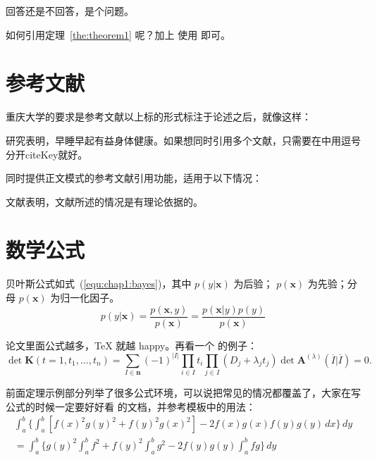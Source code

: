 \begin{problem}
	回答还是不回答，是个问题。 
\end{problem}

如何引用定理~\ref{the:theorem1} 呢？加上  使用  即可。

\section{参考文献}
\label{sec:bib}
重庆大学的要求是参考文献以上标的形式标注于论述之后，就像这样：

研究表明\cite{r1}，早睡早起有益身体健康。如果想同时引用多个文献\cite{r2,r3,r4,r6}，只需要在中用逗号分开\textsf{citeKey}就好。

\cquthesis 同时提供正文模式的参考文献引用功能，适用于以下情况：

文献表明，文献所述的情况是有理论依据的。

\section{数学公式}
\label{sec:equation}
贝叶斯公式如式~(\ref{equ:chap1:bayes})，其中 $p(y|\mathbf{x})$ 为后验；
$p(\mathbf{x})$ 为先验；分母 $p(\mathbf{x})$ 为归一化因子。
\begin{equation}
\label{equ:chap1:bayes}
p(y|\mathbf{x}) = \frac{p(\mathbf{x},y)}{p(\mathbf{x})}=
\frac{p(\mathbf{x}|y)p(y)}{p(\mathbf{x})} 
\end{equation}

论文里面公式越多，\TeX{} 就越 happy。再看一个  的例子：
\newcommand{\envert}[1]{\left\lvert#1\right\rvert} 
\begin{equation}\label{detK2}
\det\mathbf{K}(t=1,t_1,\dots,t_n)=\sum_{I\in\mathbf{n}}(-1)^{\envert{I}}
\prod_{i\in I}t_i\prod_{j\in I}(D_j+\lambda_jt_j)\det\mathbf{A}
^{(\lambda)}(\overline{I}|\overline{I})=0.
\end{equation} 

前面定理示例部分列举了很多公式环境，可以说把常见的情况都覆盖了，大家在写公式的时候一定要好好看  的文档，并参考模板中的用法：
\begin{multline*}%
\int_a^b\biggl\{\int_a^b[f(x)^2g(y)^2+f(y)^2g(x)^2]
-2f(x)g(x)f(y)g(y)\,dx\biggr\}\,dy \\
=\int_a^b\biggl\{g(y)^2\int_a^bf^2+f(y)^2
\int_a^b g^2-2f(y)g(y)\int_a^b fg\biggr\}\,dy
\end{multline*}

